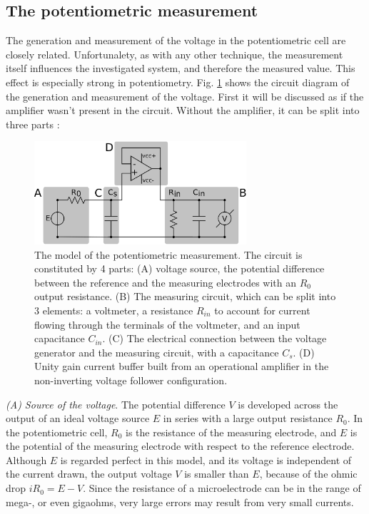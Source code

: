 		\subsection{The potentiometric measurement}
The generation and measurement of the voltage in the potentiometric cell are closely related.
Unfortunalety, as with any other technique, the measurement itself influences the investigated system, and therefore the measured value.
This effect is especially strong in potentiometry.
Fig. \ref{fig:loading_error} shows the circuit diagram of the generation and measurement of the voltage.
First it will be discussed as if the amplifier wasn't present in the circuit.
Without the amplifier, it can be split into three parts \cite{halliwell1987using}:

\begin{figure}
\centering
\includegraphics[width=0.7\textwidth]{img/theory/loading_error_2.eps}
\caption[The model of the potentiometric measurement.]{The model of the potentiometric measurement. The circuit is constituted by 4 parts: (A) voltage source, the potential difference between the reference and the measuring electrodes with an $R_0$ output resistance. (B) The measuring circuit, which can be split into 3 elements: a voltmeter, a resistance $R_{in}$ to account for current flowing through the terminals of the voltmeter, and an input capacitance $C_{in}$. (C) The electrical connection between the voltage generator and the measuring circuit, with a capacitance $C_s$. (D) Unity gain current buffer built from an operational amplifier in the non-inverting voltage follower configuration.}
\label{fig:loading_error}
\end{figure}

\emph{(A) Source of the voltage}.
The potential difference $V$ is developed across the output of an ideal voltage source $E$ in series with a large output resistance $R_0$.
In the potentiometric cell, $R_0$ is the resistance of the measuring electrode, and $E$ is the potential of the measuring electrode with respect to the reference electrode.
Although $E$ is regarded perfect in this model, and its voltage is independent of the current drawn, the output voltage $V$ is smaller than $E$, because of the ohmic drop $iR_0 = E - V$.
Since the resistance of a microelectrode can be in the range of mega-, or even gigaohms, very large errors may result from very small currents.

